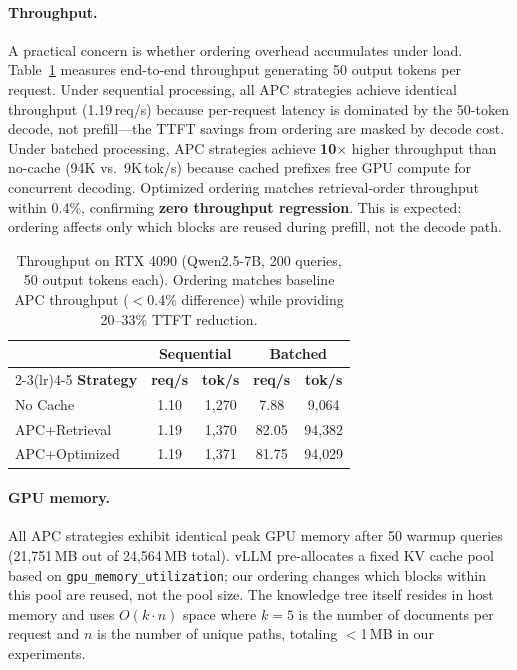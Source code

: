 \documentclass{article}
\begin{document}
\paragraph{Throughput.}
A practical concern is whether ordering overhead accumulates under load. Table~\ref{tab:throughput} measures end-to-end throughput generating 50 output tokens per request.
Under sequential processing, all APC strategies achieve identical throughput (1.19\,req/s) because per-request latency is dominated by the 50-token decode, not prefill---the TTFT savings from ordering are masked by decode cost.
Under batched processing, APC strategies achieve \textbf{10$\times$} higher throughput than no-cache (94K vs.\ 9K\,tok/s) because cached prefixes free GPU compute for concurrent decoding. Optimized ordering matches retrieval-order throughput within 0.4\%, confirming \textbf{zero throughput regression}. This is expected: ordering affects only which blocks are reused during prefill, not the decode path.

\begin{table}[t]
\caption{Throughput on RTX 4090 (Qwen2.5-7B, 200 queries, 50 output tokens each). Ordering matches baseline APC throughput ($<$0.4\% difference) while providing 20--33\% TTFT reduction.}
\label{tab:throughput}
\centering
\small
\begin{tabular}{@{}lcccc@{}}
\toprule
 & \multicolumn{2}{c}{\textbf{Sequential}} & \multicolumn{2}{c}{\textbf{Batched}} \\
\cmidrule(lr){2-3}\cmidrule(lr){4-5}
\textbf{Strategy} & \textbf{req/s} & \textbf{tok/s} & \textbf{req/s} & \textbf{tok/s} \\
\midrule
No Cache      & 1.10 & 1{,}270 & 7.88 & 9{,}064 \\
APC+Retrieval & 1.19 & 1{,}370 & 82.05 & 94{,}382 \\
APC+Optimized & 1.19 & 1{,}371 & 81.75 & 94{,}029 \\
\bottomrule
\end{tabular}
\vspace{-0.5em}
\end{table}

\paragraph{GPU memory.} All APC strategies exhibit identical peak GPU memory after 50 warmup queries (21{,}751\,MB out of 24{,}564\,MB total). vLLM pre-allocates a fixed KV cache pool based on \texttt{gpu\_memory\_utilization}; our ordering changes which blocks within this pool are reused, not the pool size. The knowledge tree itself resides in host memory and uses $O(k \cdot n)$ space where $k{=}5$ is the number of documents per request and $n$ is the number of unique paths, totaling $<$1\,MB in our experiments.
\end{document}
